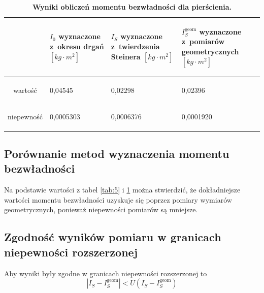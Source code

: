 \documentclass[a4paper,11pt]{article}
\begin{document}
\begin{table}[ht]
\caption{\textbf{Wyniki obliczeń momentu bezwładności dla pierścienia.}}
\label{tab:6}
\centering
\begin{tabular}{|c|m{30mm}|m{30mm}|m{30mm}|}
\hline
& \begin{center}
\textbf{$I_{0}$ wyznaczone z~okresu drgań $[kg\cdot m^{2}]$}
\end{center} & \begin{center}
\textbf{$I_{S}$ wyznaczone z~twierdzenia Steinera $[kg\cdot m^{2}]$}
\end{center} & \begin{center}
\textbf{$I_{S}^{\text{geom}}$ wyznaczone z~pomiarów geometrycznych $[kg\cdot m^{2}]$}
\end{center}  \\ \hline
wartość & \begin{center}0,04545\end{center} & \begin{center}0,02298\end{center} & \begin{center}0,02396\end{center}\\ \hline
niepewność &\begin{center} 0,0005303\end{center} & \begin{center}0,0006376\end{center} & \begin{center}0,0001920\end{center}\\ \hline
\end{tabular}
\end{table}

\subsection{Porównanie metod wyznaczenia momentu bezwładności}
Na podstawie wartości z tabel {\ref{tab:5}} i {\ref{tab:6}} można stwierdzić, że dokładniejsze wartości momentu bezwładności uzyskuje się poprzez pomiary wymiarów geometrycznych, ponieważ niepewności pomiarów są mniejsze.

\subsection{Zgodność wyników pomiaru w granicach niepewności rozszerzonej}
Aby wyniki były zgodne w granicach niepewności rozszerzonej to 
\begin{equation}
\left|I_{S} - I_{S}^{\text{geom}}\right|<U(I_{S} - I_{S}^{\text{geom}})
\end{equation}
\end{document}
